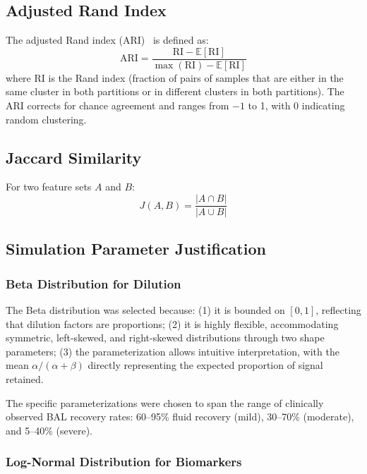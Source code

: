 \documentclass[12pt]{article}
\begin{document}
\subsection{Adjusted Rand Index}

The adjusted Rand index (ARI)~\cite{Hubert1985} is defined as:
\begin{equation}
\mathrm{ARI} = \frac{\mathrm{RI} - \mathbb{E}[\mathrm{RI}]}{\max(\mathrm{RI}) - \mathbb{E}[\mathrm{RI}]}
\end{equation}
where RI is the Rand index (fraction of pairs of samples that are either in the same cluster in both partitions or in different clusters in both partitions). The ARI corrects for chance agreement and ranges from $-1$ to 1, with 0 indicating random clustering.

\subsection{Jaccard Similarity}

For two feature sets $A$ and $B$:
\begin{equation}
J(A, B) = \frac{|A \cap B|}{|A \cup B|}
\end{equation}

\subsection{Simulation Parameter Justification}

\subsubsection{Beta Distribution for Dilution}

The Beta distribution was selected because: (1) it is bounded on $[0, 1]$, reflecting that dilution factors are proportions; (2) it is highly flexible, accommodating symmetric, left-skewed, and right-skewed distributions through two shape parameters; (3) the parameterization allows intuitive interpretation, with the mean $\alpha/(\alpha+\beta)$ directly representing the expected proportion of signal retained.

The specific parameterizations were chosen to span the range of clinically observed BAL recovery rates: 60--95\% fluid recovery (mild), 30--70\% (moderate), and 5--40\% (severe).

\subsubsection{Log-Normal Distribution for Biomarkers}
\end{document}
